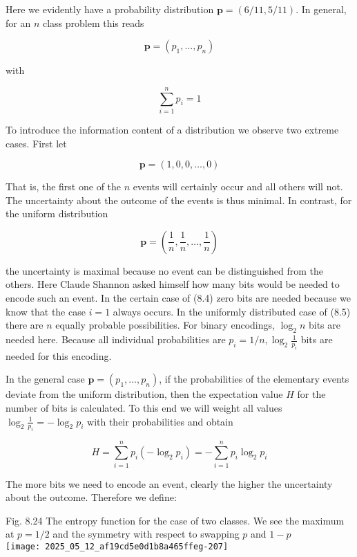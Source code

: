\documentclass[10pt]{article}
\begin{document}
Here we evidently have a probability distribution $\boldsymbol{p}=(6 / 11,5 / 11)$. In general, for an $n$ class problem this reads

$$
\boldsymbol{p}=\left(p_{1}, \ldots, p_{n}\right)
$$

with

$$
\sum_{i=1}^{n} p_{i}=1
$$

To introduce the information content of a distribution we observe two extreme cases. First let


\begin{equation*}
\boldsymbol{p}=(1,0,0, \ldots, 0) \tag{8.4}
\end{equation*}


That is, the first one of the $n$ events will certainly occur and all others will not. The uncertainty about the outcome of the events is thus minimal. In contrast, for the uniform distribution


\begin{equation*}
\boldsymbol{p}=\left(\frac{1}{n}, \frac{1}{n}, \ldots, \frac{1}{n}\right) \tag{8.5}
\end{equation*}


the uncertainty is maximal because no event can be distinguished from the others. Here Claude Shannon asked himself how many bits would be needed to encode such an event. In the certain case of (8.4) zero bits are needed because we know that the case $i=1$ always occurs. In the uniformly distributed case of (8.5) there are $n$ equally probable possibilities. For binary encodings, $\log _{2} n$ bits are needed here. Because all individual probabilities are $p_{i}=1 / n, \log _{2} \frac{1}{p_{i}}$ bits are needed for this encoding.

In the general case $\boldsymbol{p}=\left(p_{1}, \ldots, p_{n}\right)$, if the probabilities of the elementary events deviate from the uniform distribution, then the expectation value $H$ for the number of bits is calculated. To this end we will weight all values $\log _{2} \frac{1}{p_{i}}=-\log _{2} p_{i}$ with their probabilities and obtain

$$
H=\sum_{i=1}^{n} p_{i}\left(-\log _{2} p_{i}\right)=-\sum_{i=1}^{n} p_{i} \log _{2} p_{i}
$$

The more bits we need to encode an event, clearly the higher the uncertainty about the outcome. Therefore we define:

Fig. 8.24 The entropy function for the case of two classes. We see the maximum at $p=1 / 2$ and the symmetry with respect to swapping $p$ and $1-p$\\
\texttt{[image: 2025\_05\_12\_af19cd5e0d1b8a465ffeg-207]}
\end{document}
